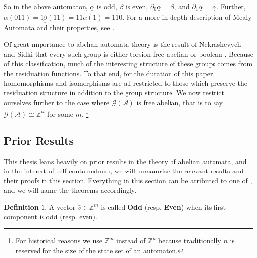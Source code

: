 \documentclass{article}
\newcommand{\A}{\mathcal{A}}
\newcommand{\G}{\mathcal{G}}
\newcommand{\Z}{\mathbb{Z}}
\newcommand{\2}{\textbf{2}}
\newcommand{\del}{\partial}
\newcommand{\vv}{\bar{v}}
\theoremstyle{definition}
\newtheorem{defn}{Definition}
\begin{document}
So in the above automaton, $\underline{\alpha}$ is odd, $\underline{\beta}$ 
is even, $\del_0 \underline{\alpha} = \underline{\beta}$, 
and $\del_1 \underline{\alpha} = \underline{\alpha}$.
Further,
$\underline{\alpha}(011) = 1\underline{\beta}(11) = 11\underline{\alpha}(1) = 110$.
For a more in depth description of Mealy Automata and their properties, 
see \cite{Sakarovitch09:automata_theory,Holcombe}.

Of great importance to abelian automata theory is the result of 
Nekrashevych and Sidki that every such group is either torsion free abelian or 
boolean \cite{NekrashevychSidki04:automorphisms}. Because of this classification, 
much of the interesting structure of these groups comes from the residuation
functions. To that end, for the duration of this paper, 
homomorphisms and isomorphisms are all restricted to those 
which preserve the residuation structure in addition to the group structure.
We now restrict ourselves further to the case where $\G(\A)$ is 
free abelian, that is to say $\G(\A) \cong \Z^m$ for some $m$.
\footnote%
{%
  For historical reasons we use $\Z^m$ instead of $\Z^n$ because 
  traditionally $n$ is reserved for the size of the state set of 
  an automaton.
}

\subsection{Prior Results}
This thesis leans heavily on prior results in the theory of abelian automata,
and in the interest of self-containedness, we will sumamrize the relevant
results and their proofs in this section. Everything in this section can be
atributed to one of \cite{NekrashevychSidki04:automorphisms, Sutner18:abelian_automata, Okano15:thesis}, 
and we will name the theorems accordingly.

\begin{defn}
  A vector $\vv \in \Z^m$ is called \textbf{Odd} (resp. \textbf{Even}) 
  when its first component is odd (resp. even). 
\end{defn}
\end{document}
